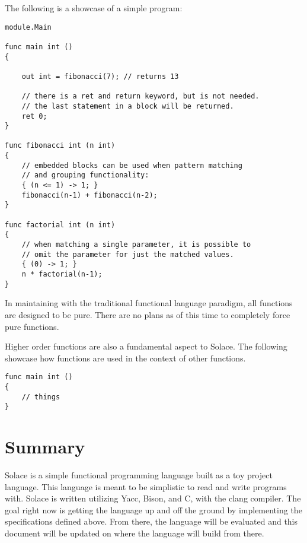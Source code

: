 \documentclass{article}
\begin{document}
The following is a showcase of a simple program:
\begin{lstlisting}
module.Main

func main int ()
{
	
	out int = fibonacci(7); // returns 13
	
	// there is a ret and return keyword, but is not needed.
	// the last statement in a block will be returned.
	ret 0;
}

func fibonacci int (n int)
{
	// embedded blocks can be used when pattern matching
	// and grouping functionality:
	{ (n <= 1) -> 1; }
	fibonacci(n-1) + fibonacci(n-2);
}

func factorial int (n int)
{
	// when matching a single parameter, it is possible to
	// omit the parameter for just the matched values.
	{ (0) -> 1; }
	n * factorial(n-1);
}
\end{lstlisting}

In maintaining with the traditional functional language paradigm, all functions are
designed to be pure. There are no plans as of this time to completely force pure functions.

Higher order functions are also a fundamental aspect to Solace. The following showcase
how functions are used in the context of other functions.

\begin{lstlisting}
func main int ()
{
	// things
}
\end{lstlisting}

\section{Summary}
Solace is a simple functional programming language built as a toy project language.
This language is meant to be simplistic to read and write programs with. Solace is written 
utilizing Yacc, Bison, and C, with the clang compiler.
The goal right now is getting the language up and off the ground by implementing the
specifications defined above. From there, the language will be evaluated and this document
will be updated on where the language will build from there.
\end{document}
